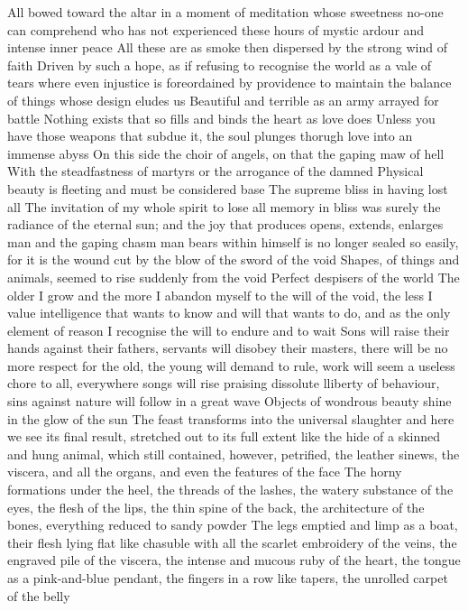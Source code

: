 \documentclass{article}
\begin{document}
\iffalse
All bowed toward the altar in a moment of meditation whose sweetness no-one can comprehend who has not experienced these hours of mystic ardour and intense inner peace
All these are as smoke then dispersed by the strong wind of faith
Driven by such a hope, as if refusing to recognise the world as a vale of tears where even injustice is foreordained by providence to maintain the balance of things whose design eludes us
Beautiful and terrible as an army arrayed for battle
Nothing exists that so fills and binds the heart as love does
Unless you have those weapons that subdue it, the soul plunges thorugh love into an immense abyss
On this side the choir of angels, on that the gaping maw of hell
With the steadfastness of martyrs or the arrogance of the damned
Physical beauty is fleeting and must be considered base
The supreme bliss in having lost all
The invitation of my whole spirit to lose all memory in bliss was surely the radiance of the eternal sun; and the joy that produces opens, extends, enlarges man and the gaping chasm man bears within himself is no longer sealed so easily, for it is the wound cut by the blow of the sword of the void
Shapes, of things and animals, seemed to rise suddenly from the void
Perfect despisers of the world
The older I grow and the more I abandon myself to the will of the void, the less I value intelligence that wants to know and will that wants to do, and as the only element of reason I recognise the will to endure and to wait
Sons will raise their hands against their fathers, servants will disobey their masters, there will be no more respect for the old, the young will demand to rule, work will seem a useless chore to all, everywhere songs will rise praising dissolute lliberty of behaviour, sins against nature will follow in a great wave
Objects of wondrous beauty shine in the glow of the sun
The feast transforms into the universal slaughter and here we see its final result, stretched out to its full extent like the hide of a skinned and hung animal, which still contained, however, petrified, the leather sinews, the viscera, and all the organs, and even the features of the face
The horny formations under the heel, the threads of the lashes, the watery substance of the eyes, the flesh of the lips, the thin spine of the back, the architecture of the bones, everything reduced to sandy powder
The legs emptied and limp as a boat, their flesh lying flat like chasuble with all the scarlet embroidery of the veins, the engraved pile of the viscera, the intense and mucous ruby of the heart, the tongue as a pink-and-blue pendant, the fingers in a row like tapers, the unrolled carpet of the belly
\end{document}
